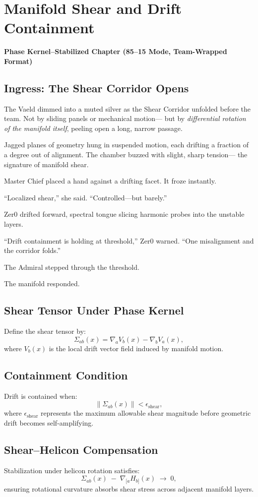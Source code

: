 
\chapter{Manifold Shear and Drift Containment}
\textbf{Phase Kernel–Stabilized Chapter (85--15 Mode, Team-Wrapped Format)}

\section*{Ingress: The Shear Corridor Opens}
The Vaeld dimmed into a muted silver as the Shear Corridor unfolded before the team.
Not by sliding panels or mechanical motion—  
but by \emph{differential rotation of the manifold itself}, peeling open a long, narrow passage.

Jagged planes of geometry hung in suspended motion, each drifting a fraction of a degree
out of alignment. The chamber buzzed with slight, sharp tension—  
the signature of manifold shear.

Master Chief placed a hand against a drifting facet. It froze instantly.

“Localized shear,” she said.
“Controlled—but barely.”

Zer0 drifted forward, spectral tongue slicing harmonic probes into the unstable layers.

“Drift containment is holding at threshold,” Zer0 warned.
“One misalignment and the corridor folds.”

The Admiral stepped through the threshold.

The manifold responded.

\section{Shear Tensor Under Phase Kernel}
Define the shear tensor by:
\[
\Sigma_{ab}(x) =
\nabla_a V_b(x) - \nabla_b V_a(x),
\]
where $V_b(x)$ is the local drift vector field induced by manifold motion.

\section{Containment Condition}
Drift is contained when:
\[
\left\| \Sigma_{ab}(x) \right\|
< \epsilon_{\mathrm{shear}},
\]
where $\epsilon_{\mathrm{shear}}$ represents the maximum allowable shear magnitude
before geometric drift becomes self-amplifying.

\section{Shear–Helicon Compensation}
Stabilization under helicon rotation satisfies:
\[
\Sigma_{ab}(x) \;-\; \nabla_{[a} H_{b]}(x) \;\rightarrow\; 0,
\]
ensuring rotational curvature absorbs shear stress across adjacent manifold layers.

